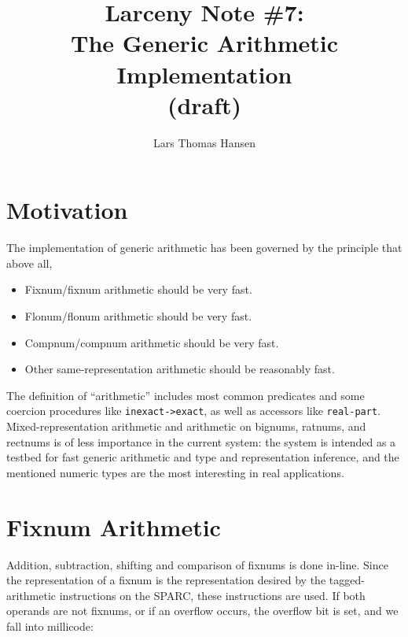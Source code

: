 %


\title{Larceny Note \#7: \\
       The Generic Arithmetic Implementation \\
       {\tenrm (draft)}}
\author{Lars Thomas Hansen}


\maketitle

\section{Motivation}

The implementation of generic arithmetic has been governed by the principle
that above all,

\begin{itemize}
\item Fixnum/fixnum arithmetic should be very fast.
\item Flonum/flonum arithmetic should be very fast.
\item Compnum/compnum arithmetic should be very fast.
\item Other same-representation arithmetic should be reasonably fast.
\end{itemize}

The definition of ``arithmetic'' includes most common predicates and
some coercion procedures like \verb+inexact->exact+, as well as accessors
like \verb+real-part+.
Mixed-representation arithmetic and arithmetic on bignums, ratnums,
and rectnums is of less importance in the current system: the system
is intended as a testbed for fast generic arithmetic and type and
representation inference, and the mentioned numeric types are the most
interesting in real applications.

\section{Fixnum Arithmetic}

Addition, subtraction, shifting and comparison of fixnums is done
in-line.  Since the representation of a fixnum is the representation
desired by the tagged-arithmetic instructions on the SPARC, these
instructions are used. If both operands are not fixnums, or if an
overflow occurs, the overflow bit is set, and we fall into millicode:

